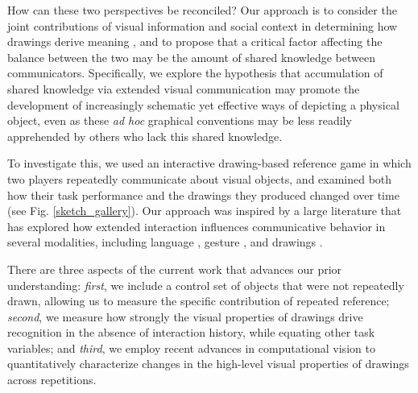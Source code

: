 \documentclass[10pt,letterpaper]{article}
\begin{document}
How can these two perspectives be reconciled?
Our approach is to consider the joint contributions of visual information and social context in determining how drawings derive meaning \cite{fan2018modeling,abell2009canny}, and to propose that a critical factor affecting the balance between the two may be the amount of shared knowledge between communicators.
Specifically, we explore the hypothesis that accumulation of shared knowledge via extended visual communication may promote the development of increasingly schematic yet effective ways of depicting a physical object, even as these \textit{ad hoc} graphical conventions may be less readily apprehended by others who lack this shared knowledge.

To investigate this, we used an interactive drawing-based reference game in which two players repeatedly communicate about visual objects, and examined both how their task performance and the drawings they produced changed over time (see Fig. \ref{sketch_gallery}). 
Our approach was inspired by a large literature that has explored how extended interaction influences communicative behavior in several modalities, including language \cite{krauss1964changes,ClarkWilkesGibbs86_ReferringCollaborative,HawkinsFrankGoodman17_ConventionFormation}, gesture \cite{goldin1996silence,fay2014creating}, and drawings \cite{garrod_foundations_2007,fay2010interactive}.



There are three aspects of the current work that advances our prior understanding: \emph{first}, we include a control set of objects that were not repeatedly drawn, allowing us to measure the specific contribution of repeated reference; \emph{second}, we measure how strongly the visual properties of drawings drive recognition in the absence of interaction history, while equating other task variables; and \emph{third}, we employ recent advances in computational vision to quantitatively characterize changes in the high-level visual properties of drawings across repetitions.
\end{document}
